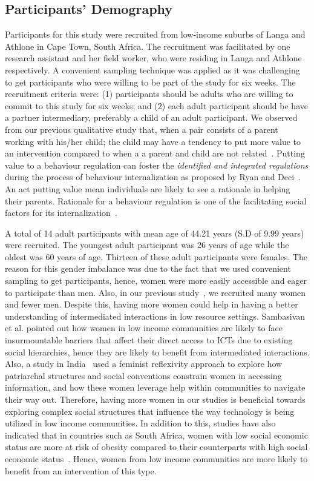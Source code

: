 \documentclass{sig-alternate}
\begin{document}
\subsection{Participants' Demography}
Participants for this study were recruited from low-income suburbs of Langa and Athlone in Cape Town, South Africa. The recruitment was facilitated by one research assistant and her field worker, who were residing in Langa and Athlone respectively. A convenient sampling technique was applied as it was challenging to get participants who were willing to be part of the study for six weeks.  The recruitment criteria were: (1) participants should be adults who are willing to commit to this study for six weeks; and (2) each adult participant should be have a partner intermediary, preferably a child of an adult participant. We observed from our previous qualitative study that, when a pair consists of a parent working with his/her child; the child may have a tendency to put more value to an intervention compared to when a a parent and child are not related~\cite{katule2016:leveraging}. Putting value to a behaviour regulation can foster the \emph{identified and integrated regulations} during the process of behaviour internalization as proposed by Ryan and Deci~\cite{ryan2000intrinsic}. An act putting value mean individuals are likely to see a rationale in helping their parents. Rationale for a behaviour regulation is one of the facilitating social factors for  its internalization~\cite{deci1994facilitating}. 

A total of 14 adult participants with mean age of 44.21 years (S.D of 9.99 years) were recruited.  The youngest adult participant was 26 years of age while the oldest was 60 years of age. Thirteen of these adult participants were females. The reason for this gender imbalance was due to the fact that we used convenient sampling to get participants, hence, women were more easily accessible and eager to participate than men.  Also, in our previous study~\cite{katule2016:leveraging}, we recruited many women and fewer men. Despite this, having more women could help in having a better understanding of intermediated interactions in low resource settings. Sambasivan et al.\cite{sambasivan2010} pointed out how women in low income communities are likely to face insurmountable barriers that affect their direct access to ICTs due to existing social hierarchies, hence they are likely to benefit from intermediated interactions. Also, a study in India~\cite{kumar2015mobile} used a feminist reflexivity approach to explore how patriarchal structures and social conventions constrain women in accessing information, and how these women leverage help within communities to navigate their way out. Therefore, having more women in our studies is beneficial towards exploring complex social structures that influence the way technology is being utilized in low income communities. In addition to this, studies have also indicated  that in countries such as South Africa, women with low social economic status are more at risk of obesity compared to their counterparts with high social economic status~\cite{katule2016:leveraging}. Hence, women from  low income communities are more likely to benefit from an intervention of this type.  
\end{document}
